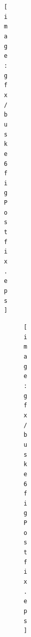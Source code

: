 \begin{figure}[htbp]
\begin{figure}[htbp]
\begin{figure}[tbp]
\begin{figure}[!t]
\begin{figure}[tbp]
\begin{figure}[!t]
\begin{figure}[tbp]
\begin{figure}[t]
\begin{figure}[tp]
\begin{figure}[!t]
\ifPhdDoc
\begin{figure}[p]\centering
\texttt{[image: gfx/buske6\\figPostfix.eps]}
\caption{MVDR implemented on a GPU. We do this in 3 steps, where each step process the full image before moving on to the next step. \\[.5\baselineskip]\textbf{Step~1}: The sample covariance matrix $\eR$ is formed by threads running along its diagonals. This allows spatial averaging to be implemented in a computationally efficient manner and minimizes interthread communication.
\\[.5\baselineskip]\textbf{Step~2}: $\eRi\1$ is computed using the heavily optimized batched linear equation solver from Nvidia~\cite{Nvidia}. 
\\[.5\baselineskip]\textbf{Step~3}: The beamformer output $z$ is computed in a straightforward fashion using $L$ threads that first sum the subarrays and then apply the MVDR weighting function. A single thread finally sums all the channels up.}\label{I_mvdr_implementation}
\else
\ifPeerReview
\begin{figure}[!t]\centering
\texttt{[image: gfx/buske6\\figPostfix.eps]}
\else
\begin{figure}[!t]\centering
\includegraphics[width=\linewidth]{gfx/mvdr_implementation.eps}

\end{figure}
\end{figure}
\end{figure}
\end{figure}
\end{figure}
\end{figure}
\end{figure}
\end{figure}
\end{figure}
\end{figure}
\end{figure}
\end{figure}
\end{figure}
